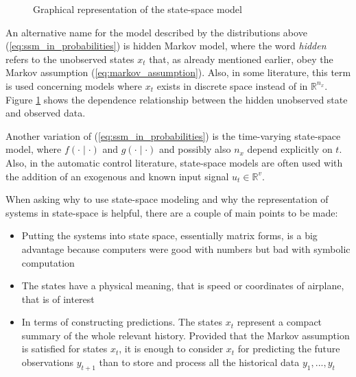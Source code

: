 \begin{figure}[!ht]
\centering
\caption{Graphical representation of the state-space model}
\label{fig:SSM_graphical_representation}
\end{figure}

An alternative name for the model described by the distributions above (\ref{eq:ssm_in_probabilities}) is hidden Markov model, where the word \emph{hidden} refers to the unobserved states \(x_t\) that, as already mentioned earlier, obey the Markov assumption (\ref{eq:markov_assumption}). Also, in some literature, this term is used concerning models where \(x_t\) exists in discrete space instead of in \(\mathbb{R}^{n_x} \). Figure \ref{fig:SSM_graphical_representation} shows the dependence relationship between the hidden unobserved state and observed data.


Another variation of (\ref{eq:ssm_in_probabilities}) is the time-varying state-space model, where  \(f(\cdot \mid \cdot)\) and \(g(\cdot \mid \cdot )\) and possibly also \(n_x\) depend explicitly on \(t\). Also, in the automatic control literature, state-space models are often used with the addition of an exogenous and known input signal \(u_t \in \mathbb{R}^{v}\).

When asking why to use state-space modeling and why the representation of systems in state-space is helpful, there are a couple of main points to be made:
\begin{itemize}
    \item Putting the systems into state space, essentially matrix forms, is a big advantage because computers were good with numbers but bad with symbolic computation
    \item The states have a physical meaning, that is speed or coordinates of airplane, that is of interest
    \item In terms of constructing predictions. The states \(x_t\) represent a compact summary of the whole relevant history. Provided that the Markov assumption is satisfied for states \(x_t\), it is enough to consider \(x_t\) for predicting the future observations \(y_{t+1}\) than to store and process all the historical data \(y_1, . . . , y_t\)
\end{itemize}

